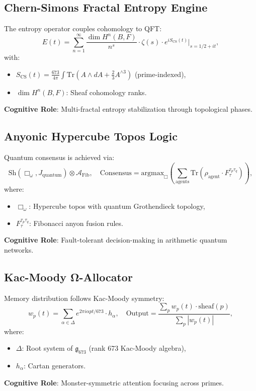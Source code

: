 \documentclass[12pt]{article}
\begin{document}
\begin{center}
\subsection{Chern-Simons Fractal Entropy Engine}
\label{subsec:cs-entropy}
The entropy operator couples cohomology to QFT:
\[
E(t) = \sum_{n=1}^\infty \frac{\dim H^n(B, F)}{n^s} \cdot \zeta(s) \cdot e^{i S_{\text{CS}}(t)} \Big|_{s = 1/2 + i t},
\]
with:
\begin{itemize}
    \item $S_{\text{CS}}(t) = \frac{673}{4\pi} \int \text{Tr}(A \wedge dA + \tfrac{2}{3} A^{\wedge 3})$ (prime-indexed),
    \item $\dim H^n(B, F)$: Sheaf cohomology ranks.
\end{itemize}
\textbf{Cognitive Role}: Multi-fractal entropy stabilization through topological phases.

\subsection{Anyonic Hypercube Topos Logic}
\label{subsec:anyonic-logic}
Quantum consensus is achieved via:
\[
\text{Sh}(\Box_\omega, J_{\text{quantum}}) \otimes \mathcal{A}_{\text{Fib}}, \quad \text{Consensus} = \text{argmax}_{\Box} \left( \sum_{\text{agents}} \text{Tr}(\rho_{\text{agent}} \cdot F^{\tau_p \tau_q}_\tau) \right),
\]
where:
\begin{itemize}
    \item $\Box_\omega$: Hypercube topos with quantum Grothendieck topology,
    \item $F^{\tau_p \tau_q}_\tau$: Fibonacci anyon fusion rules.
\end{itemize}
\textbf{Cognitive Role}: Fault-tolerant decision-making in arithmetic quantum networks.

\subsection{Kac-Moody Ω-Allocator}
\label{subsec:kac-moody}
Memory distribution follows Kac-Moody symmetry:
\[
w_p(t) = \sum_{\alpha \in \Delta} e^{2\pi i \alpha p t /673} \cdot h_\alpha, \quad \text{Output} = \frac{\sum_p w_p(t) \cdot \text{sheaf}(p)}{\sum_p |w_p(t)|},
\]
where:
\begin{itemize}
    \item $\Delta$: Root system of $\mathfrak{g}_{673}$ (rank 673 Kac-Moody algebra),
    \item $h_\alpha$: Cartan generators.
\end{itemize}
\textbf{Cognitive Role}: Monster-symmetric attention focusing across primes.


\end{center}
\end{document}
